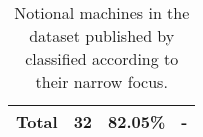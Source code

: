 \begin{table}[h]
\begin{minipage}{0.45\textwidth}
\begin{tabular}{|l||r|r|l|}
\hline
\textbf{Total} & 32    & 82.05\%   & -   \\
\hline
\end{tabular}
\caption{Notional machines in the dataset published by \citet{fincherNotionalMachinesComputing2020} classified according to their narrow focus.}
\label{tab:nm-classification-narrow-focus}
    \end{minipage}
\end{table}






